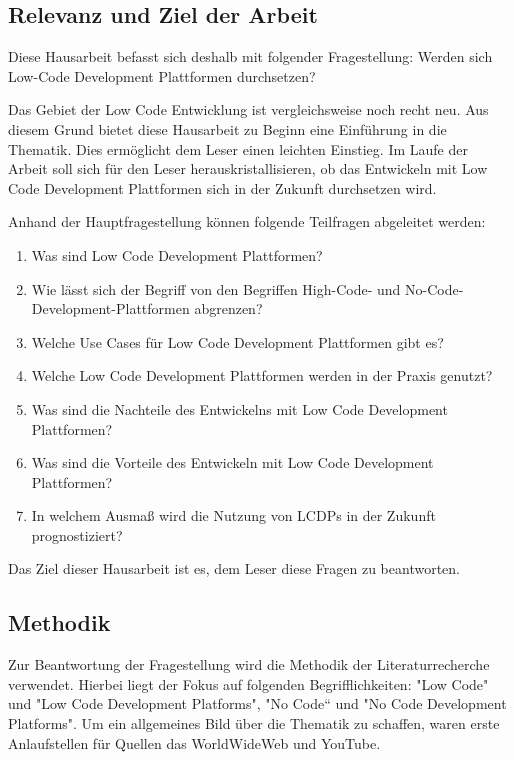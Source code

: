 \documentclass[12pt]{article} %
\begin{document}
	\subsection{Relevanz und Ziel der Arbeit}	
	Diese Hausarbeit befasst sich deshalb mit folgender Fragestellung:\newline
			Werden sich Low-Code Development Plattformen durchsetzen? \newline
			
	Das Gebiet der Low Code Entwicklung ist vergleichsweise noch recht neu. Aus diesem Grund bietet diese Hausarbeit zu Beginn eine Einführung in die Thematik. Dies ermöglicht dem Leser einen leichten Einstieg. Im Laufe der Arbeit soll sich für den Leser herauskristallisieren, ob das Entwickeln mit Low Code Development Plattformen sich in der Zukunft durchsetzen wird. \newline
	
	Anhand der Hauptfragestellung können folgende Teilfragen abgeleitet werden:
	\begin{enumerate}[label=(\roman*)]
		\setlength{\itemsep}{1pt}
		\item Was sind Low Code Development Plattformen? 
		\item Wie lässt sich der Begriff von den Begriffen High-Code- und No-Code-Development-Plattformen abgrenzen?
		\item Welche Use Cases für Low Code Development Plattformen gibt es? 
		\item Welche Low Code Development Plattformen werden in der Praxis genutzt?
		\item Was sind die Nachteile des Entwickelns mit Low Code Development Plattformen? 
		\item Was sind die Vorteile des Entwickeln mit Low Code Development Plattformen? 
		\item In welchem Ausmaß wird die Nutzung von LCDPs in der Zukunft prognostiziert?	
	\end{enumerate}

	Das Ziel dieser Hausarbeit ist es, dem Leser diese Fragen zu beantworten. 
	
	\subsection{Methodik}
	Zur Beantwortung der Fragestellung wird die Methodik der Literaturrecherche verwendet. Hierbei liegt der Fokus auf folgenden Begrifflichkeiten:
	"Low Code" und "Low Code Development Platforms", "No Code“ und "No Code Development Platforms". 
	Um ein allgemeines Bild über die Thematik zu schaffen, waren erste Anlaufstellen für Quellen das WorldWideWeb und YouTube. \newline
	
\end{document}
